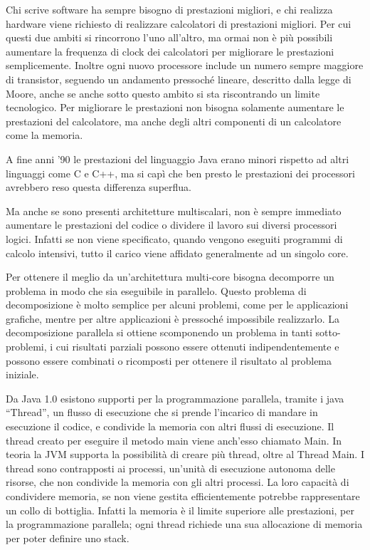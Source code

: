 \documentclass{article}
\numberwithin{equation}{subsection}
\begin{document}
Chi scrive software ha sempre bisogno di prestazioni migliori, e chi realizza hardware viene richiesto di realizzare calcolatori di prestazioni migliori. Per cui 
questi due ambiti si rincorrono l'uno all'altro, ma ormai non è più possibili aumentare la frequenza di clock dei calcolatori per migliorare le prestazioni semplicemente. 
Inoltre ogni nuovo processore include un numero sempre maggiore di transistor, seguendo un andamento pressoché lineare, descritto dalla legge di Moore, anche se anche sotto 
questo ambito si sta riscontrando un limite tecnologico. Per migliorare le prestazioni non bisogna solamente aumentare le prestazioni del calcolatore, ma anche degli altri 
componenti di un calcolatore come la memoria. 


A fine anni '90 le prestazioni del linguaggio Java erano minori rispetto ad altri linguaggi come C e C++, ma si capì che ben presto le prestazioni dei processori avrebbero 
reso questa differenza superflua. 


Ma anche se sono presenti architetture multiscalari, non è sempre immediato aumentare le prestazioni del codice o dividere il lavoro sui diversi processori logici. Infatti 
se non viene specificato, quando vengono eseguiti programmi di calcolo intensivi, tutto il carico viene affidato generalmente ad un singolo core. 

Per ottenere il meglio da un'architettura multi-core bisogna decomporre un problema in modo che sia eseguibile in parallelo. Questo problema di decomposizione è molto semplice 
per alcuni problemi, come per le applicazioni grafiche, mentre per altre applicazioni è pressoché impossibile realizzarlo. 
La decomposizione parallela si ottiene scomponendo un problema in tanti sotto-problemi, i cui risultati parziali possono essere ottenuti indipendentemente e possono essere 
combinati o ricomposti per ottenere il risultato al problema iniziale. 


Da Java 1.0 esistono supporti per la programmazione parallela, tramite i java ``Thread'', un flusso di esecuzione che si prende l'incarico di mandare in esecuzione il 
codice, e condivide la memoria con altri flussi di esecuzione. Il thread creato per eseguire il metodo main viene anch'esso chiamato Main. In teoria la JVM supporta la 
possibilità di creare più thread, oltre al Thread Main. I thread sono contrapposti ai processi, un'unità di esecuzione 
autonoma delle risorse, che non condivide la memoria con gli altri processi. La loro capacità di condividere memoria, se non viene gestita efficientemente potrebbe 
rappresentare un collo di bottiglia. Infatti la memoria è il limite superiore alle prestazioni, per la programmazione parallela; ogni thread richiede una sua 
allocazione di memoria per poter definire uno stack. 
\end{document}
